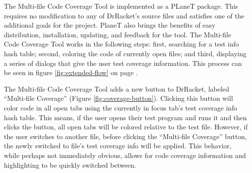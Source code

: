 The Multi-file Code Coverage Tool is implemented as a PLaneT package. This requires no modification to any of DrRacket's source files and satisfies one of the additional goals for the project. PlaneT also brings the benefits of easy distribution, installation, updating, and feedback for the tool. The Multi-file Code Coverage Tool works in the following steps: first, searching for a test info hash table; second, coloring the code of currently open files; and third, displaying a series of dialogs that give the user test coverage information. This process can be seen in figure \ref{fig:extended-flow} on page \pageref{fig:extended-flow}.

The Multi-file Code Coverage Tool adds a new button to DrRacket, labeled ``Multi-file Coverage'' (Figure \ref{fig:coverage-button}). Clicking this button will color code in all open tabs using the currently in focus tab's test coverage info hash table. This means, if the user opens their test program and runs it and then clicks the button, all open tabs will be colored relative to the test file. However, if the user switches to another file, before clicking the ``Multi-file Coverage'' button, the newly switched to file's test coverage info will be applied. This behavior, while perhaps not immediately obvious, allows for code coverage information and highlighting to be quickly switched between.



